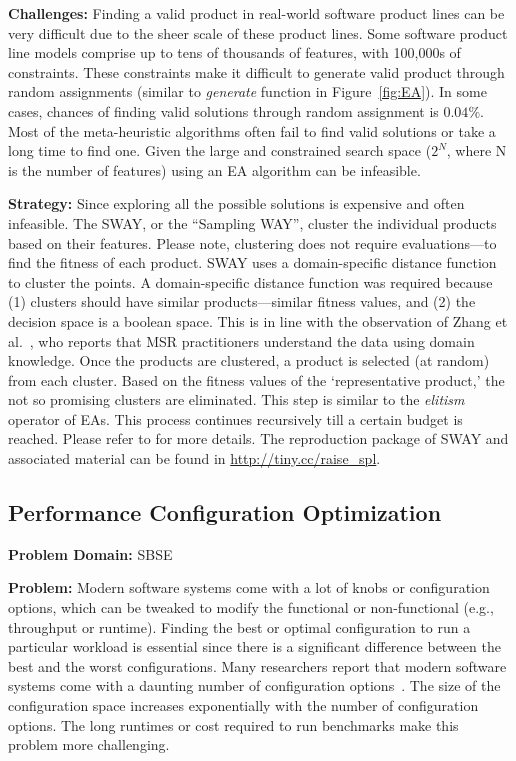 \documentclass[table, xcdraw, sigconf,review, anonymous]{acmart}
\begin{document}
\noindent\textbf{Challenges: } Finding a valid product in real-world software product lines can be very difficult due to the sheer scale of these product lines. Some software product line models comprise up to tens of thousands
of features,  with 100,000s of constraints. These constraints make it difficult to generate valid product through random assignments (similar to \textit{generate} function in Figure~\ref{fig:EA}). In some cases, chances of finding valid solutions through random assignment is $0.04\%$. Most of the meta-heuristic algorithms often fail to find valid solutions or take a long time to find one. Given the large and constrained search space ($2^N$, where N is the number of features) using an EA algorithm can be infeasible.

\noindent\textbf{Strategy:} Since exploring all the possible solutions is expensive and often infeasible. The SWAY, or the ``Sampling WAY'', cluster the individual products based on their features. Please note, clustering does not require evaluations---to find the fitness of each product. SWAY uses a domain-specific distance function to cluster the points. A domain-specific distance function was required because (1) clusters should have similar products---similar fitness values, and (2) the decision space is a boolean space. This is in line with the observation of Zhang et al.~\cite{zhang2013software}, who reports that MSR practitioners understand the data using domain knowledge. Once the products are clustered, a product is selected (at random) from each cluster. Based on the fitness values of the `representative product,' the not so promising clusters are eliminated. This step is similar to the \textit{elitism} operator of EAs. This process continues recursively till a certain budget is reached. Please refer to \cite{nair2016accidental, chen2017beyond, chen2017sampling} for more details. The reproduction package of SWAY and associated material can be found in \url{http://tiny.cc/raise_spl}.


\subsection{Performance Configuration Optimization}
\noindent\textbf{Problem Domain: } SBSE

\noindent\textbf{Problem: } Modern software systems come with a lot of knobs or configuration options, which can be tweaked to modify the functional or non-functional (e.g., throughput or runtime). Finding the best or optimal configuration to run a particular workload is essential since there is a significant difference between the best and the worst configurations. Many researchers report that modern software systems come with a daunting number of configuration options~\cite{xu2015hey}. The size of the configuration space increases exponentially with the number of configuration options. The long runtimes or cost required to run benchmarks make this problem more challenging.
\end{document}
